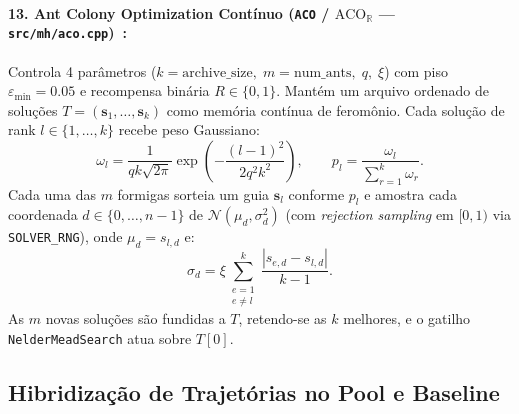 \documentclass[11pt,a4paper]{article}
\begin{document}
\paragraph{13. Ant Colony Optimization Contínuo (\texttt{ACO} / $\text{ACO}_{\mathbb{R}}$ --- \texttt{src/mh/aco.cpp})~\cite{socha2008acor}:}
Controla 4 parâmetros ($k = \text{archive\_size},\; m = \text{num\_ants},\; q,\; \xi$) com piso $\varepsilon_{\min} = 0.05$ e recompensa binária $R \in \{0,1\}$. Mantém um arquivo ordenado de soluções $T = (\mathbf{s}_1, \dots, \mathbf{s}_k)$ como memória contínua de feromônio. Cada solução de rank $l \in \{1,\dots,k\}$ recebe peso Gaussiano:
\begin{equation}
  \omega_l = \frac{1}{q k \sqrt{2\pi}} \exp\!\left(-\frac{(l-1)^2}{2 q^2 k^2}\right),
  \qquad
  p_l = \frac{\omega_l}{\sum_{r=1}^{k} \omega_r}.
\end{equation}
Cada uma das $m$ formigas sorteia um guia $\mathbf{s}_l$ conforme $p_l$ e amostra cada coordenada $d \in \{0,\dots,n-1\}$ de $\mathcal{N}(\mu_d, \sigma_d^2)$ (com \emph{rejection sampling} em $[0,1)$ via \texttt{SOLVER\_RNG}), onde $\mu_d = s_{l,d}$ e:
\begin{equation}
  \sigma_d = \xi \sum_{\substack{e=1 \\ e \ne l}}^{k} \frac{|s_{e,d} - s_{l,d}|}{k - 1}.
\end{equation}
As $m$ novas soluções são fundidas a $T$, retendo-se as $k$ melhores, e o gatilho \texttt{NelderMeadSearch} atua sobre $T[0]$.

\subsection{Hibridização de Trajetórias no Pool e Baseline}
\end{document}
